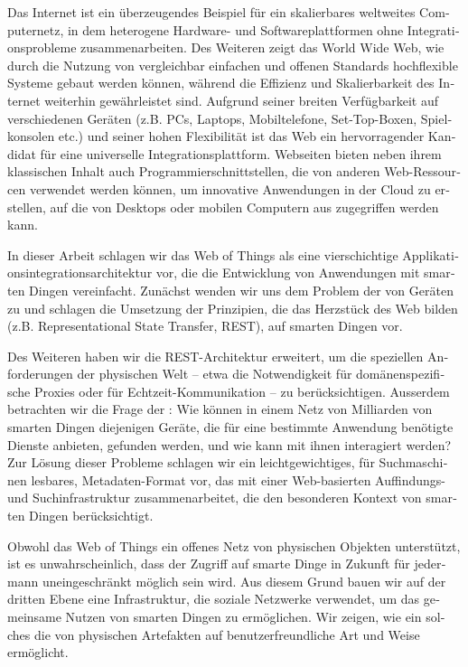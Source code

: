 \begin{otherlanguage}{ngerman}
Das Internet ist ein \"{u}berzeugendes Beispiel f\"{u}r ein skalierbares weltweites Computernetz, in dem heterogene Hardware- und Softwareplattformen ohne Integrationsprobleme zusammenarbeiten. Des Weiteren zeigt das World Wide Web, wie durch die Nutzung von vergleichbar einfachen und offenen Standards hochflexible Systeme gebaut werden k\"{o}nnen, w\"{a}hrend die Effizienz und Skalierbarkeit des Internet weiterhin gew\"{a}hrleistet sind. Aufgrund seiner breiten Verf\"{u}gbarkeit auf verschiedenen Ger\"{a}ten (z.B. PCs, Laptops, Mobiltelefone, Set-Top-Boxen, Spielkonsolen etc.) und seiner hohen Flexibilit\"{a}t ist das Web ein hervorragender Kandidat f\"{u}r eine universelle Integrationsplattform. Webseiten bieten neben ihrem klassischen Inhalt auch Programmierschnittstellen, die von anderen Web-Ressourcen verwendet werden k\"{o}nnen, um innovative Anwendungen in der Cloud zu erstellen, auf die von Desktops oder mobilen Computern aus zugegriffen werden kann.

In dieser Arbeit schlagen wir das Web of Things als eine vierschichtige Applikationsintegrationsarchitektur vor, die die Entwicklung von Anwendungen mit smarten Dingen vereinfacht. Zun\"{a}chst wenden wir uns dem Problem der  von Ger\"{a}ten zu und schlagen die Umsetzung der Prinzipien, die das Herzst\"{u}ck des Web bilden (z.B. Representational State Transfer, REST), auf smarten Dingen vor.

Des Weiteren haben wir die REST-Architektur erweitert, um die speziellen Anforderungen der physischen Welt -- etwa die Notwendigkeit f\"{u}r dom\"{a}nenspezifische Proxies oder f\"{u}r Echtzeit-Kommunikation -- zu ber\"{u}cksichtigen. Ausserdem betrachten wir die Frage der : Wie k\"{o}nnen in einem Netz von Milliarden von smarten Dingen diejenigen Ger\"{a}te, die f\"{u}r eine bestimmte Anwendung ben\"{o}tigte Dienste anbieten, gefunden werden, und wie kann mit ihnen interagiert werden? Zur L\"{o}sung dieser Probleme schlagen wir ein leichtgewichtiges, f\"{u}r Suchmaschinen lesbares, Metadaten-Format vor, das mit einer Web-basierten Auffindungs- und Suchinfrastruktur zusammenarbeitet, die den besonderen Kontext von smarten Dingen ber\"{u}cksichtigt.

Obwohl das Web of Things ein offenes Netz von physischen Objekten unterst\"{u}tzt, ist es unwahrscheinlich, dass der Zugriff auf smarte Dinge in Zukunft f\"{u}r jedermann uneingeschr\"{a}nkt m\"{o}glich sein wird. Aus diesem Grund bauen wir auf der dritten Ebene eine Infrastruktur, die soziale Netzwerke verwendet, um das gemeinsame Nutzen von smarten Dingen zu erm\"{o}glichen. Wir zeigen, wie ein solches  die  von physischen Artefakten auf benutzerfreundliche Art und Weise erm\"{o}glicht.


\end{otherlanguage}
